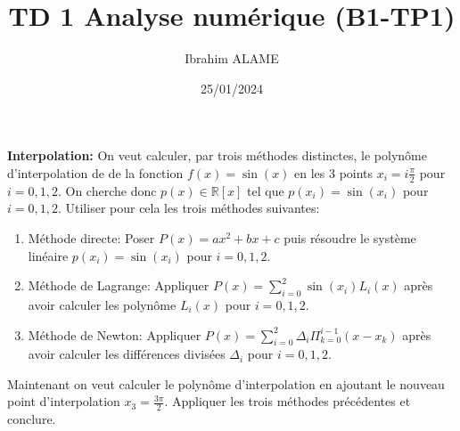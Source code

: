 \documentclass[a4paper]{article}
\title{TD 1 Analyse numérique (B1-TP1)}
\author{Ibrahim ALAME}
\date{25/01/2024}
\begin{document}
\maketitle
\section{}
{\bf Interpolation: } On veut calculer, par trois méthodes distinctes, le polynôme d'interpolation de de la fonction $f(x) = \sin(x)$ en les $3$ points $x_i =i\frac{\pi}{2}$ pour $i = 0, 1 , 2$. On cherche donc $p(x)\in\mathbb{R}[x]$ tel que $p(x_i) = \sin(x_i )$ pour $i = 0, 1 , 2$. Utiliser pour cela les trois méthodes suivantes:
\begin{enumerate}
\item Méthode directe: Poser $P(x)=ax^2+bx+c$ puis résoudre le système linéaire $p(x_i) = \sin(x_i )$ pour $i = 0, 1 , 2$.
\item Méthode de Lagrange: Appliquer $P(x)=\sum_{i=0}^2\sin(x_i)L_i(x)$ après avoir calculer les polynôme $L_i(x)$ pour $i = 0, 1 , 2$.
\item Méthode de Newton: Appliquer $P(x)=\sum_{i=0}^2\Delta_i\Pi_{k=0}^{i-1}(x-x_k)$ après avoir calculer les différences divisées $\Delta_i$ pour $i = 0, 1 , 2$.
\end{enumerate}
\begin{center}

\end{center}
Maintenant on veut calculer le polynôme d'interpolation en ajoutant le nouveau point d'interpolation $x_3=\frac{3\pi}2$. Appliquer les trois méthodes précédentes et conclure.

\begin{center}

\end{center}
\end{document}
